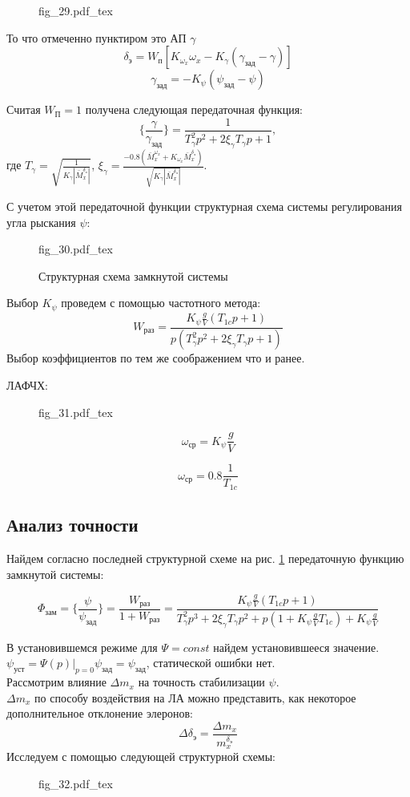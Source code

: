 \documentclass{article}
\begin{document}
\begin{figure}[H]
	\centering
	{fig_29.pdf_tex}
\end{figure}

То что отмеченно пунктиром это АП $\gamma$
\[
	\delta_\text{э} = W_\text{п}[K_{\omega_x}\omega_x - K_{\gamma}(\gamma_\text{зад} - \gamma)]
\]
\[
	\gamma_\text{зад} = -K_{\psi}(\psi_\text{зад} - \psi)
\]

Считая $W_\text{П} = 1$ получена следующая передаточная функция:
\[
	\{\frac{\gamma}{\gamma_\text{зад}} \}=\frac{1}{T_{\gamma}^2 p^2 + 2 \xi_{\gamma} T_\gamma p + 1},
\]
где $T_{\gamma} = \sqrt{\frac{1}{K_{\gamma}|\bar{M}_x^{\delta_\text{э}}|}}$, $\xi_{\gamma} =\frac{-0.8(\bar{M}_x^{\omega_x} + K_{\omega_x} \bar{M}_x^{\delta_\text{э}})}{\sqrt{K_\gamma |\bar{M}_x^{\delta_\text{э}}|}}$.

С учетом этой передаточной функции структурная схема системы регулирования угла рыскания $\psi$:

\begin{figure}[h]
	\centering
	{fig_30.pdf_tex}
	\caption{Структурная схема замкнутой системы}
	\label{fig:zam30}
\end{figure}

Выбор $K_{\psi}$ проведем с помощью частотного метода:
\[
	W_\text{раз} = \frac{K_{\psi} \frac{g}{V} (T_{1c}p + 1)}{p(T_{\gamma}^2 p^2 + 2 \xi_\gamma T_\gamma p + 1)}
\]
Выбор коэффициентов по тем же соображением что и ранее.


ЛАФЧХ:
\begin{figure}[H]
	\centering
	{fig_31.pdf_tex}
\end{figure}

\[
	\omega_\text{ср} = K_{\psi}\frac{g}{V}
\]

\[
	\omega_\text{ср} = 0.8\frac{1}{T_{1c}}
\]

\subsection{Анализ точности}
Найдем согласно последней структурной схеме на рис. \ref{fig:zam30} передаточную функцию замкнутой системы:

\[
	\Phi_\text{зам} = \{\frac{\psi}{\psi_\text{зад}} \} = \frac{W_\text{раз}}{1 + W_\text{раз}} = \frac{K_{\psi}\frac{g}{V}(T_{1c}p + 1)}{T_{\gamma}^2 p^3 + 2\xi_\gamma T_\gamma p^2 + p(1 + K_{\psi}\frac{g}{V} T_{1c}) + K_{\psi}\frac{g}{V}}
\]

В установившемся режиме для $\Psi = const$ найдем установившееся значение.\\
$\psi_\text{уст} = \Psi(p) |_{p=0}  \psi _\text{зад}= \psi_\text{зад}$, статической ошибки нет.\\
Рассмотрим влияние $\Delta m_x$ на точность стабилизации $\psi$.\\
$\Delta m_x$ по способу воздействия на ЛА можно представить, как некоторое дополнительное отклонение элеронов:
\[
	\Delta \delta_\text{э} =\frac{\Delta m_x}{m_x^{\delta_\text{э}}} 
\]
Исследуем с помощью следующей структурной схемы:
\begin{figure}[H]
	\centering
	{fig_32.pdf_tex}
\end{figure}
\end{document}
